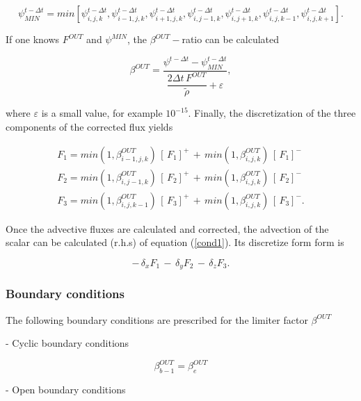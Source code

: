\begin{equation}
\psi_{MIN}^{t-\Delta {t}}=
min[\psi^{t-\Delta {t}}_{i,j,k},
\psi^{t-\Delta {t}}_{i-1,j,k}, \psi^{t-\Delta {t}}_{i+1,j,k},
\psi^{t-\Delta {t}}_{i,j-1,k}, \psi^{t-\Delta {t}}_{i,j+1,k},
\psi^{t-\Delta {t}}_{i,j,k-1}, \psi^{t-\Delta {t}}_{i,j,k+1}].
\end{equation}

If one knows $F^{OUT}$ and $\psi^{MIN}$, the $\beta^{OUT}-$ratio
can be calculated

\begin{equation}
\beta^{OUT}=
 \dfrac{ \psi^{t-\Delta {t}}- \psi_{MIN}^{t-\Delta {t}}   }
{\dfrac{ {2 \Delta t} \, {F}^{OUT}}{\tilde{\rho}} +\varepsilon },
\end{equation}

\noindent where $\varepsilon$ is a small value, for example $10^{-15}$. Finally,
the discretization of the three components of the corrected flux yields

\begin{eqnarray}
{F_1} = min(1,\beta_{i-1,j,k}^{OUT})\,[\,F_1]^{+}\,+\,
min(1,\beta^{OUT}_{i,j,k})\,[\,F_1]^{-}\\
{F_2} = min(1,\beta_{i,j-1,k}^{OUT})\,[\,F_2]^{+}\,+\,
min(1,\beta^{OUT}_{i,j,k})\,[\,F_2]^{-}\\
{F_3} = min(1,\beta^{OUT}_{i,j,k-1})\,[\,F_3]^{+}\,+\,
min(1,\beta^{OUT}_{i,j,k})\,[\,F_3]^{-}.
\end{eqnarray}

Once the advective fluxes are calculated and corrected, the advection of the
scalar can be calculated (r.h.s) of equation (\ref{cond1}). Its discretize form
form is

\begin{equation}
-\,\delta_{x}F_1\,-\,\delta_{y}F_2\,-\,\delta_{z}F_3.
\end{equation}

\subsubsection{Boundary conditions}

The following boundary conditions are prescribed for the limiter factor $\beta^{OUT}$

- Cyclic boundary conditions

\begin{equation}
\beta^{OUT}_{b-1}=\beta^{OUT}_{e}
\end{equation}

- Open boundary conditions

